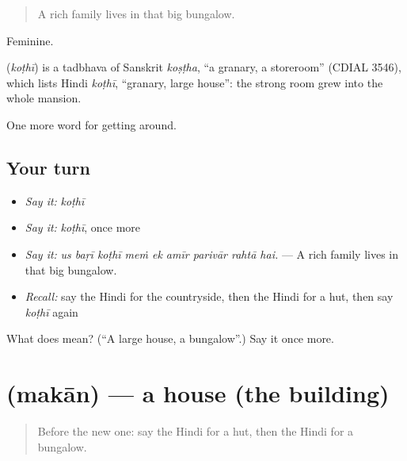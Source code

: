 \begin{quote}
A rich family lives in that big bungalow.
\end{quote}

Feminine.

\begin{cousinweb}
\textbf{} (\emph{koṭhī}) is a tadbhava of Sanskrit \emph{koṣṭha}, \textquotedblleft{}a granary, a storeroom\textquotedblright{} (CDIAL 3546), which lists Hindi \emph{koṭhī}, \textquotedblleft{}granary, large house\textquotedblright{}: the strong room grew into the whole mansion.
\end{cousinweb}

\begin{grammarlens}[title={What you've built}]
One more word for getting around.
\end{grammarlens}

\subsection*{Your turn}
\begin{itemize}
\raggedright
  \item \emph{Say it:} \emph{koṭhī}
  \item \emph{Say it:} \emph{koṭhī}, once more
  \item \emph{Say it:} \emph{us baṛī koṭhī meṁ ek amīr parivār rahtā hai.} — A rich family lives in that big bungalow.
  \item \emph{Recall:} say the Hindi for the countryside, then the Hindi for a hut, then say \emph{koṭhī} again
\end{itemize}

\begin{tcolorbox}[breakable,colback=teal!4,colframe=teal!35!black,title={Before you move on}]
What does  mean? (\textquotedblleft{}A large house, a bungalow\textquotedblright{}.) Say it once more.
\end{tcolorbox}
\section[\texorpdfstring{\hi{मकान} (makān)}{मकान (makān)}]{ (makān) — a house (the building)}

\label{lesson:HI-C422-makan}



\begin{quote}
Before the new one: say the Hindi for a hut, then the Hindi for a bungalow.
\end{quote}

